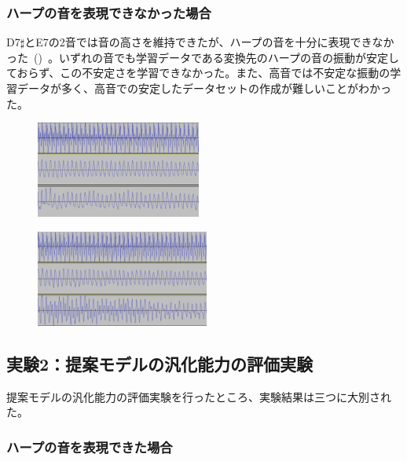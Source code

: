 \subsubsection{ハープの音を表現できなかった場合}
\label{sec:harp_rep}

D7$\sharp$とE7の2音では音の高さを維持できたが、ハープの音を十分に表現できなかった~()~。いずれの音でも学習データである変換先のハープの音の振動が安定しておらず、この不安定さを学習できなかった。また、高音では不安定な振動の学習データが多く、高音での安定したデータセットの作成が難しいことがわかった。

\begin{figure}[b]
\centering
\begin{minipage}[b]{0.48\columnwidth}
\centering
\includegraphics[height=90pt]{figure/88_88_det/d7s_0550_0700.png}
\label{fig:88_88_bad1}
\end{minipage}
\begin{minipage}[b]{0.48\columnwidth}
\centering
\includegraphics[height=90pt]{figure/88_88_det/e7_0550_0700.png}
\label{fig:88_88_bad2}
\end{minipage}
\caption[実験1：ハープの音を表現できなかった音波]{}
\label{fig:88_88_bad}
\end{figure}

\subsection{実験2：提案モデルの汎化能力の評価実験}

提案モデルの汎化能力の評価実験を行ったところ、実験結果は三つに大別された。

\clearpage

\subsubsection{ハープの音を表現できた場合}

